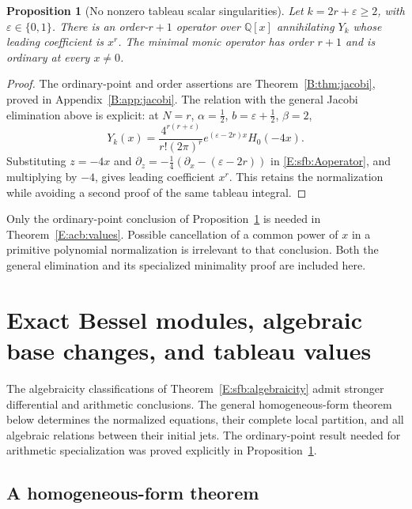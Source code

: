 \documentclass[11pt,a4paper]{article}
\newtheorem{proposition}[theorem]{Proposition}
\theoremstyle{definition}
\theoremstyle{remark}
\numberwithin{equation}{section}
\begin{document}
\begin{proposition}[No nonzero tableau scalar singularities]
\label{E:sfb:tableauordinary}
Let $k=2r+\varepsilon\ge2$, with $\varepsilon\in\{0,1\}$.
There is an order-$r+1$ operator over $\mathbb Q[x]$
annihilating $Y_k$ whose leading coefficient is $x^r$.
The minimal monic operator has order $r+1$ and is ordinary
at every $x\ne0$.
\end{proposition}
\begin{proof}
The ordinary-point and order assertions are
Theorem~\ref{B:thm:jacobi}, proved in
Appendix~\ref{B:app:jacobi}. The relation with the general
Jacobi elimination above is explicit: at
$N=r$, $\alpha=\tfrac12$, $b=\varepsilon+\tfrac12$, $\beta=2$,
\begin{equation}\label{E:sfb:JacobiY}
 Y_k(x)=\frac{4^{r(r+\varepsilon)}}{r!(2\pi)^r}
          e^{(\varepsilon-2r)x}H_0(-4x).
\end{equation}
Substituting $z=-4x$ and
$\partial_z=-\tfrac14(\partial_x-(\varepsilon-2r))$
in \eqref{E:sfb:Aoperator}, and multiplying by $-4$,
gives leading coefficient $x^r$. This retains the normalization
while avoiding a second proof of the same tableau integral.
\end{proof}

Only the ordinary-point conclusion of
Proposition~\ref{E:sfb:tableauordinary} is needed in
Theorem~\ref{E:acb:values}.  Possible cancellation of a common
power of $x$ in a primitive polynomial normalization is irrelevant
to that conclusion.  Both the general elimination and its specialized minimality proof are included here.


\clearpage

\section{Exact Bessel modules, algebraic base changes, and tableau values}
\label{E:acb:section}

The algebraicity classifications of Theorem~\ref{E:sfb:algebraicity}
admit stronger differential and arithmetic conclusions.  The general
homogeneous-form theorem below determines the normalized equations,
their complete local partition, and all algebraic relations between
their initial jets.  The ordinary-point result needed for arithmetic
specialization was proved explicitly in
Proposition~\ref{E:sfb:tableauordinary}.

\subsection{A homogeneous-form theorem}
\end{document}
